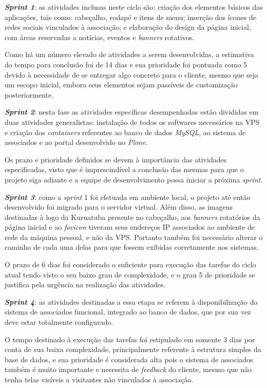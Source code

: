 \textbf{\textit{Sprint 1}}: as atividades inclusas neste ciclo são: criação dos elementos básicos das aplicações, tais como: cabeçalho, rodapé e itens de menu; inserção dos ícones de redes sociais vinculados à associação; e elaboração do design da página inicial, com áreas reservadas a notícias, eventos e \textit{banners} rotativos.

Como há um número elevado de atividades a serem desenvolvidas, a estimativa do tempo para conclusão foi de 14 dias e sua prioridade foi pontuada como 5 devido à necessidade de se entregar algo concreto para o cliente, mesmo que seja um escopo inicial, embora seus elementos sejam passíveis de customização posteriormente. 

\textbf{\textit{Sprint 2}}: nesta fase as atividades específicas desempenhadas estão divididas em duas atividades generalistas: instalação de todos os softwares necessários na VPS e criação dos \textit{containers} referentes ao banco de dados \textit{MySQL}, ao sistema de associados e ao portal desenvolvido no \textit{Plone}. 

Os prazo e prioridade definidos se devem à importância das atividades especificadas, visto que é imprescindível a conclusão das mesmas para que o projeto siga adiante e a equipe de desenvolvimento possa iniciar a próxima \textit{sprint}. 

\textbf{\textit{Sprint 3}}: como a \textit{sprint} 1 foi efetuada em ambiente local, o projeto até então desenvolvido foi migrado para o servidor virtual. Além disso, as imagens destinadas à logo da Kuruatuba presente no cabeçalho, aos \textit{banners} rotatórios da página inicial e ao \textit{favicon} tiveram seus endereços IP associados ao ambiente de rede da máquina pessoal, e não da VPS. Portanto também foi necessário alterar o caminho de cada uma delas para que fossem exibidas corretamente nos sistemas.

O prazo de 6 dias foi considerado o suficiente para execução das tarefas do ciclo atual tendo visto o seu baixo grau de complexidade, e o grau 5 de prioridade se justifica pela urgência na realização das atividades. 

\textbf{\textit{Sprint 4}}: as atividades destinadas a essa etapa se referem à disponibilização do sistema de associados funcional, integrado ao banco de dados, que por sua vez deve estar totalmente configurado. 

O tempo destinado à execução das tarefas foi estipulado em somente 3 dias por conta de sua baixa complexidade, principalmente referente à estrutura simples da base de dados, e sua prioridade é considerada alta pois o sistema de associados também é muito importante e necessita de \textit{feedback} do cliente, mesmo que não tenha telas visíveis a visitantes não vinculados à associação. 


